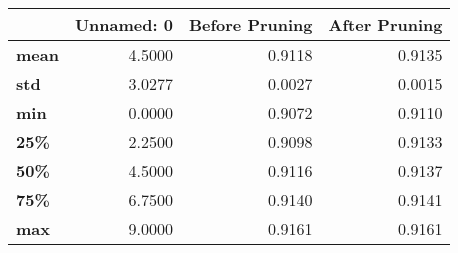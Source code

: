 \begin{tabular}{lrrr}
\toprule
{} &  Unnamed: 0 &  Before Pruning &  After Pruning \\
\midrule
\textbf{mean} &      4.5000 &          0.9118 &         0.9135 \\
\textbf{std } &      3.0277 &          0.0027 &         0.0015 \\
\textbf{min } &      0.0000 &          0.9072 &         0.9110 \\
\textbf{25\% } &      2.2500 &          0.9098 &         0.9133 \\
\textbf{50\% } &      4.5000 &          0.9116 &         0.9137 \\
\textbf{75\% } &      6.7500 &          0.9140 &         0.9141 \\
\textbf{max } &      9.0000 &          0.9161 &         0.9161 \\
\bottomrule
\end{tabular}
